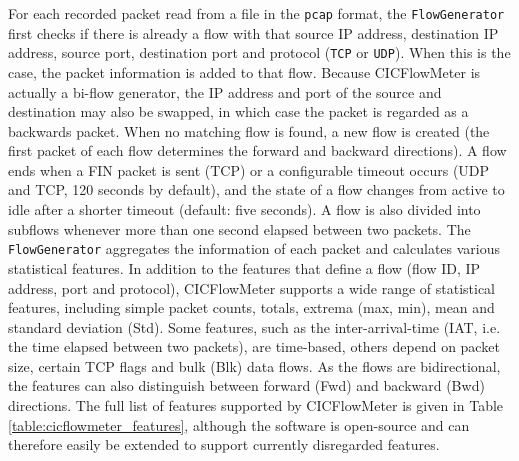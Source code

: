 \documentclass[conference]{IEEEtran}
\begin{document}
For each recorded packet read from a file in the \verb|pcap| format, the \verb|FlowGenerator| first checks if there is already a flow with that source IP address, destination IP address, source port, destination port and protocol (\verb|TCP| or \verb|UDP|). When this is the case, the packet information is added to that flow. Because CICFlowMeter is actually a bi-flow generator, the IP address and port of the source and destination may also be swapped, in which case the packet is regarded as a backwards packet. When no matching flow is found, a new flow is created (the first packet of each flow determines the forward and backward directions). A flow ends when a FIN packet is sent (TCP) or a configurable timeout occurs (UDP and TCP, 120 seconds by default), and the state of a flow changes from active to idle after a shorter timeout (default: five seconds). A flow is also divided into subflows whenever more than one second elapsed between two packets. The \verb|FlowGenerator| aggregates the information of each packet and calculates various statistical features. In addition to the features that define a flow (flow ID, IP address, port and protocol), CICFlowMeter supports a wide range of statistical features, including simple packet counts, totals, extrema (max, min), mean and standard deviation (Std). Some features, such as the inter-arrival-time (IAT, i.e. the time elapsed between two packets), are time-based, others depend on packet size, certain TCP flags and bulk (Blk) data flows. As the flows are bidirectional, the features can also distinguish between forward (Fwd) and backward (Bwd) directions. The full list of features supported by CICFlowMeter is given in Table \ref{table:cicflowmeter_features}, although the software is open-source and can therefore easily be extended to support currently disregarded features.
\end{document}

